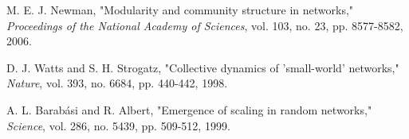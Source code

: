\documentclass[conference]{IEEEtran}
\begin{document}
\begin{thebibliography}{99}
M. E. J. Newman, "Modularity and community structure in networks," \textit{Proceedings of the National Academy of Sciences}, vol. 103, no. 23, pp. 8577-8582, 2006.

D. J. Watts and S. H. Strogatz, "Collective dynamics of 'small-world' networks," \textit{Nature}, vol. 393, no. 6684, pp. 440-442, 1998.

A. L. Barabási and R. Albert, "Emergence of scaling in random networks," \textit{Science}, vol. 286, no. 5439, pp. 509-512, 1999.

\end{thebibliography}
\end{document}
